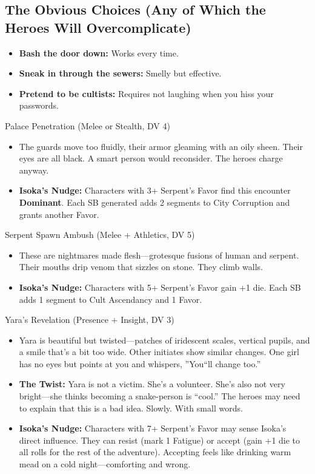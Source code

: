 \documentclass[11pt]{article}
\begin{document}
\subsection*{The Obvious Choices (Any of Which the Heroes Will Overcomplicate)}
\begin{itemize}
    \item \textbf{Bash the door down:} Works every time.
    \item \textbf{Sneak in through the sewers:} Smelly but effective.
    \item \textbf{Pretend to be cultists:} Requires not laughing when you hiss your passwords.
\end{itemize}

\begin{mechanicsbox}{Palace Penetration (Melee or Stealth, DV 4)}
\begin{itemize}
    \item The guards move too fluidly, their armor gleaming with an oily sheen. Their eyes are all black. A smart person would reconsider. The heroes charge anyway.
    \item \textbf{Isoka's Nudge:} Characters with 3+ Serpent's Favor find this encounter \textbf{Dominant}. Each SB generated adds 2 segments to City Corruption and grants another Favor.
\end{itemize}
\end{mechanicsbox}

\begin{mechanicsbox}{Serpent Spawn Ambush (Melee + Athletics, DV 5)}
\begin{itemize}
    \item These are nightmares made flesh---grotesque fusions of human and serpent. Their mouths drip venom that sizzles on stone. They climb walls.
    \item \textbf{Isoka's Nudge:} Characters with 5+ Serpent's Favor gain +1 die. Each SB adds 1 segment to Cult Ascendancy and 1 Favor.
\end{itemize}
\end{mechanicsbox}

\begin{mechanicsbox}{Yara's Revelation (Presence + Insight, DV 3)}
\begin{itemize}
    \item Yara is beautiful but twisted---patches of iridescent scales, vertical pupils, and a smile that's a bit too wide. Other initiates show similar changes. One girl has no eyes but points at you and whispers, ''You``ll change too.''
    \item \textbf{The Twist:} Yara is not a victim. She's a volunteer. She's also not very bright---she thinks becoming a snake-person is ``cool.'' The heroes may need to explain that this is a bad idea. Slowly. With small words.
    \item \textbf{Isoka's Nudge:} Characters with 7+ Serpent's Favor may sense Isoka's direct influence. They can resist (mark 1 Fatigue) or accept (gain +1 die to all rolls for the rest of the adventure). Accepting feels like drinking warm mead on a cold night---comforting and wrong.
\end{itemize}
\end{mechanicsbox}
\end{document}
